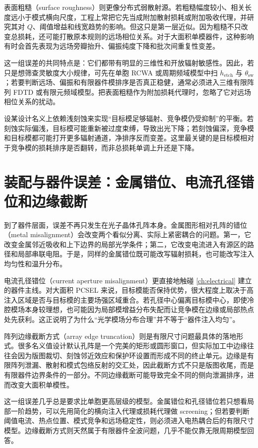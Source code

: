表面粗糙（surface roughness）则更像分布式弱散射源。若粗糙幅度较小、相关长度远小于模式横向尺度，工程上常把它先当成附加散射损耗或附加吸收代理，并研究其对 $Q$、阈值增益和线宽趋势的影响。但这只是第一层近似。因为粗糙不只改变总损耗，还可能打散原本规则的远场相位关系。对于大面积单模器件，这种影响有时会首先表现为远场旁瓣抬升、偏振纯度下降和批次间重复性变差。

这一组误差的共同特点是：它们都带有明显的三维性和开放辐射敏感性。因此，若只是想筛查灵敏度大小规律，可先在单胞 RCWA 或周期频域模型中扫 $h_{\mathrm{etch}}$ 与 $\theta_{\mathrm{sw}}$；若要判断远场、偏振和有限器件模排序是否真正稳健，通常必须进入三维有限阵列 FDTD 或有限元频域模型。把表面粗糙作为附加损耗代理时，忽略了它对远场相位关系的扰动。

设某设计名义上依赖浅刻蚀来实现“目标模足够辐射、竞争模仍受抑制”的平衡。若刻蚀实际偏浅，目标模可能重新被过度束缚，导致出光下降；若刻蚀偏深，竞争模和目标模都可能打开更多辐射通道，净排序反而变差。这里最关键的是目标模相对于竞争模的损耗排序是否翻转，而非总损耗单调上升还是下降。

\section{装配与器件误差：金属错位、电流孔径错位和边缘截断}
到了器件层面，误差不再只发生在光子晶体孔阵本身。金属图形相对孔阵的错位（metal misalignment）会改变两个看似分离、实际上紧密耦合的问题。第一，它改变金属邻近吸收和上下边界的局部光学条件；第二，它改变电流进入有源区的路径和局部串联电阻。于是，同样的金属错位既可能改写辐射损耗，也可能改写注入均匀性和温升分布。

电流孔径错位（current aperture misalignment）更直接地触碰 \cref{ch:electrical} 建立的器件主线。对大面积 PCSEL 来说，目标模能否保持优势，很大程度上取决于高注入区域是否与目标模的主要场强区域重合。若孔径中心偏离目标模中心，即使冷腔模场本身较理想，也可能因为局部模增益分布失配而让竞争模在边缘或局部热点处先获利。这正说明了为什么“光学模场分布合理”并不等于“器件注入均匀”。

阵列边缘截断方式（array edge truncation）则是有限尺寸问题最具体的落地形式。很多名义值设计默认孔阵是一个完美的矩形或圆形窗口，但实际加工中边缘往往会因为版图裁切、刻蚀邻近效应和保护环设置而形成不同的终止单元。边缘是有限阵列泄漏、散射和模式包络反射的交汇处，因此截断方式不只是版图收尾，而是有限器件边界条件的一部分。不同边缘截断可能导致完全不同的侧向泄漏排序，进而改变大面积单模性。

这一组误差几乎总是要求比单胞更高层级的模型。金属错位和孔径错位若只想看局部一阶趋势，可以先用简化的横向注入代理或损耗代理做 screening；但若要判断阈值电流、热点位置、模式竞争和远场稳定性，则必须进入电热耦合后的有限尺寸模型。边缘截断方式则天然属于有限器件全波问题，几乎不能仅靠无限周期模型回答。

